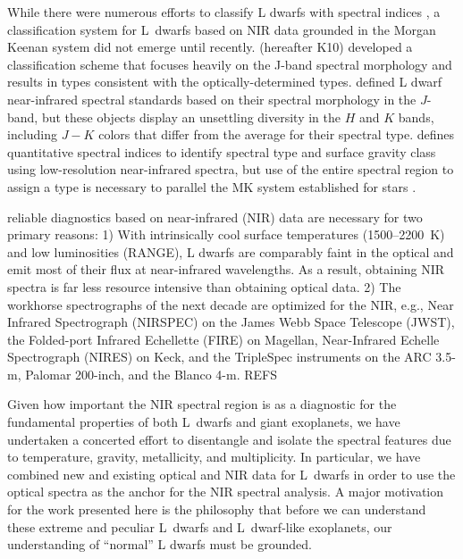 \documentclass[12pt,preprint]{aastex}
\begin{document}
While there were numerous efforts to classify L dwarfs with spectral indices \citep{Reid01_NIR, Testi01, Geballe02}, a classification system for L~dwarfs based on NIR data grounded in the Morgan Keenan system did not emerge until recently. \citet{Kirkpatrick10} (hereafter K10) developed a classification scheme that focuses heavily on the J-band spectral morphology and results in types consistent with the optically-determined types. 
\citet{Kirkpatrick10} defined L dwarf near-infrared spectral standards based on their spectral morphology in the $J$-band, but these objects display an unsettling diversity in the $H$ and $K$ bands, including $J-K$ colors that differ from the average for their spectral type. \citep{Allers13} defines quantitative spectral indices to identify spectral type and surface gravity class using low-resolution near-infrared spectra, but use of the entire spectral region to assign a type is necessary to parallel the MK system established for stars \citep{Morgan84}.

 reliable diagnostics based on near-infrared (NIR) data are necessary for two primary reasons:
1) With intrinsically cool surface temperatures (1500--2200~K) and low luminosities (RANGE), L dwarfs are comparably faint in the optical and emit most of their flux at near-infrared wavelengths. As a result, obtaining NIR spectra is far less resource intensive than obtaining optical data.
2) The workhorse spectrographs of the next decade are optimized for the NIR, e.g., Near Infrared Spectrograph (NIRSPEC) on the James Webb Space Telescope (JWST), the Folded-port Infrared Echellette (FIRE) on Magellan, Near-Infrared Echelle Spectrograph (NIRES) on Keck, and the TripleSpec instruments on the ARC 3.5-m, Palomar 200-inch, and the Blanco 4-m.
REFS

Given how important the NIR spectral region is as a diagnostic for the fundamental properties of both L~dwarfs and giant exoplanets, we have undertaken a concerted effort to disentangle and isolate the spectral features due to temperature, gravity, metallicity, and multiplicity. In particular, we have combined new and existing optical and NIR data for L~dwarfs in order to use the optical spectra as the anchor for the NIR spectral analysis. 
A major motivation for the work presented here is the philosophy that before we can understand these extreme and peculiar L~dwarfs and L~dwarf-like exoplanets, our understanding of ``normal'' L dwarfs must be grounded. 
\end{document}

